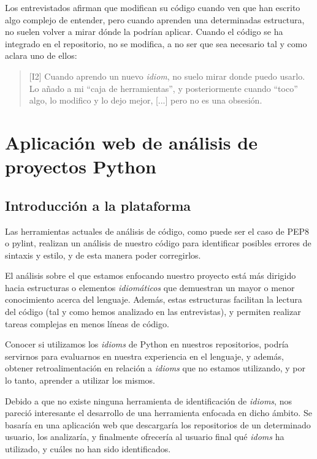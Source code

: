 \documentclass[a4paper, 12pt]{book}
\begin{document}
Los entrevistados afirman que modifican su código cuando ven que han escrito algo complejo de entender, pero cuando aprenden una determinadas estructura, no suelen volver a mirar dónde la podrían aplicar. Cuando el código se ha integrado en el repositorio, no se modifica, a no ser que sea necesario tal y como aclara uno de ellos:

\begin{quote}
\small
    [I2] Cuando aprendo un nuevo \textit{idiom}, no suelo mirar donde puedo usarlo. Lo añado a mi ``caja de herramientas'', y posteriormente cuando ``toco'' algo, lo modifico y lo dejo mejor, [...] pero no es una obsesión.
\end{quote}


\cleardoublepage
\chapter{Aplicación web de análisis de proyectos Python}
\label{chap:cuantitativo}


\section{Introducción a la plataforma}

Las herramientas actuales de análisis de código, como puede ser el caso de PEP8 o pylint, realizan un análisis de nuestro código para identificar posibles errores de sintaxis y estilo, y de esta manera poder corregirlos.

El análisis sobre el que estamos enfocando nuestro proyecto está más dirigido hacia estructuras o elementos \textit{idiomáticos} que demuestran un mayor o menor conocimiento acerca del lenguaje. Además, estas estructuras facilitan la lectura del código (tal y como hemos analizado en las entrevistas), y permiten realizar tareas complejas en menos líneas de código.

Conocer si utilizamos los \textit{idioms} de Python en nuestros repositorios, podría servirnos para evaluarnos en nuestra experiencia en el lenguaje, y además, obtener retroalimentación en relación a \textit{idioms} que no estamos utilizando, y por lo tanto, aprender a utilizar los mismos.

Debido a que no existe ninguna herramienta de identificación de \textit{idioms}, nos pareció interesante el desarrollo de una herramienta enfocada en dicho ámbito. Se basaría en una aplicación web que descargaría los repositorios de un determinado usuario, los analizaría, y finalmente ofrecería al usuario final qué \textit{idoms} ha utilizado, y cuáles no han sido identificados.
\end{document}

